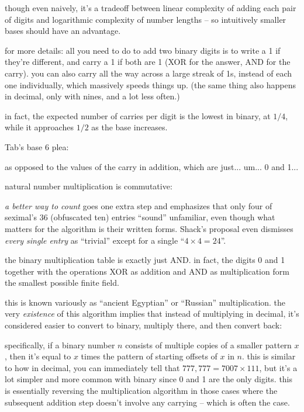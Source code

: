 \documentclass[../footnotes.tex]{subfiles}
\begin{document}

\myfootnote{} though even naively, it's a tradeoff between linear complexity of adding each pair of digits and logarithmic complexity of number lengths -- so intuitively smaller bases should have an advantage.

\myfootnote{} for more details: all you need to do to add two binary digits is to write a 1 if they're different, and carry a 1 if both are 1 (XOR for the answer, AND for the carry). you can also carry all the way across a large streak of 1s, instead of each one individually, which massively speeds things up. (the same thing also happens in decimal, only with nines, and a lot less often.)

\myfootnote{} in fact, the expected number of carries per digit is the lowest in binary, at $1/4$, while it approaches $1/2$ as the base increases.

\myfootnote{} Tab's base 6 plea: \\

\myfootnote{} as opposed to the values of the carry in addition, which are just... um... 0 and 1...

\myfootnote{} natural number multiplication is commutative: \\

\myfootnote{} {\it a better way to count} goes one extra step and emphasizes that only four of seximal's 36 (obfuscated ten) entries ``sound'' unfamiliar, even though what matters for the algorithm is their written forms. Shack's proposal even dismisses \emph{every single entry} as ``trivial'' except for a single ``$4 \times 4 = 24$''.

\myfootnote{} the binary multiplication table is exactly just AND. in fact, the digits 0 and 1 together with the operations XOR as addition and AND as multiplication form the smallest possible finite field.

\myfootnote{} this is known variously as ``ancient Egyptian'' or ``Russian'' multiplication. the very \emph{existence} of this algorithm implies that instead of multiplying in decimal, it's considered easier to convert to binary, multiply there, and then convert back: \\

\myfootnote{} specifically, if a binary number $n$ consists of multiple copies of a smaller pattern $x$, then it's equal to $x$ times the pattern of starting offsets of $x$ in $n$. this is similar to how in decimal, you can immediately tell that $777,777 = 7007 \times 111$, but it's a lot simpler and more common with binary since 0 and 1 are the only digits. this is essentially reversing the multiplication algorithm in those cases where the subsequent addition step doesn't involve any carrying -- which is often the case.
\end{document}
